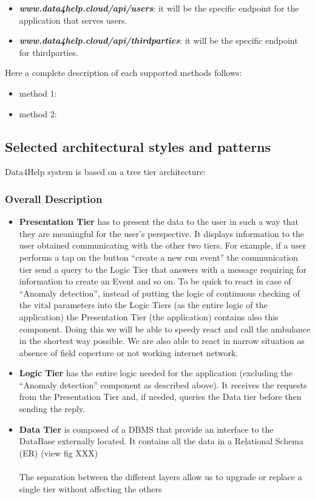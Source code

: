 \documentclass[DD.tex]{subfiles}
\begin{document}
\begin{itemize}
	\item \textit{\textbf{www.data4help.cloud/api/users}}: it will be the specific endpoint for the application that serves users.
	\item \textit{\textbf{www.data4help.cloud/api/thirdparties}}: it will be the specific endpoint for thirdparties.
\end{itemize}

Here a complete description of each supported methods follows:

\begin{itemize}
	\item method 1:
	\item method 2:
\end{itemize}

\newpage
\subsection{Selected architectural styles and patterns}
Data4Help system is based on a tree tier architecture:
\subsubsection{Overall Description}
\begin{itemize}
	\item \textbf{Presentation Tier} has to present the data to the user in such a way that they are meaningful for the user’s perspective. It displays information to the user obtained communicating with the other two tiers. For example, if a user performs a tap on the button “create a new run event” the communication tier send a query to the Logic Tier that answers with a message requiring for information to create an Event and so on.
		To be quick to react in case of “Anomaly detection”, instead of putting the logic of continuous checking of the vital parameters into the Logic Tiers (as the entire logic of the application) the Presentation Tier (the application) contains also this component. Doing this we will be able to speedy react and call the ambulance in the shortest way possible. We are also able to react in narrow situation as absence of field coperture or not working internet network.
	\item \textbf{Logic Tier} has the entire logic needed for the application (excluding the “Anomaly detection” component as described above). It receives the requests from the Presentation Tier and, if needed, queries the Data tier before then sending the reply.
	\item \textbf{Data Tier} is composed of a DBMS that provide an interface to the DataBase externally located. It contains all the data in a Relational Schema (ER) (view fig XXX)\\\\
	The separation between the different layers allow us to upgrade or replace a single tier without affecting the others
\end{itemize}
\end{document}
